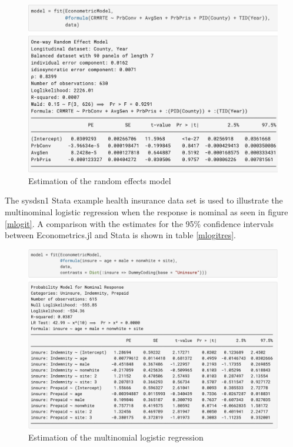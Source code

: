\documentclass{juliacon}
\begin{document}
\begin{figure}[hbpt]
	\includegraphics[max width=\linewidth,center]{estimator_re}
	\caption{Estimation of the random effects model}
	\label{random}
\end{figure}

The sysdsn1 Stata example health insurance data set is used to illustrate the multinominal logistic regression when the response is nominal as seen in figure \vref{mlogit}. A comparison with the estimates for the 95\% confidence intervals between Econometrics.jl and Stata is shown in table \vref{mlogitres}.

\begin{figure}[hbpt]
	\includegraphics[max width=\linewidth,center]{estimator_mlogit}
	\caption{Estimation of the multinomial logistic regression}
	\label{mlogit}
\end{figure}
\end{document}
